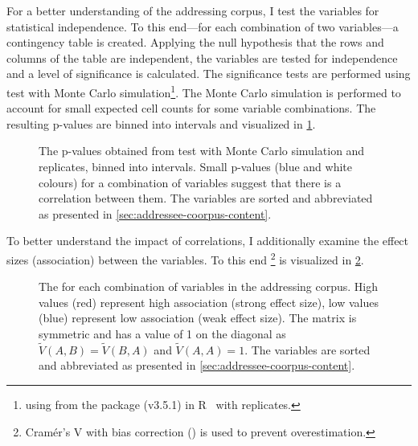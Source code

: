 For a better understanding of the \gls{addressing corpus}, I test the variables for statistical independence.
To this end---for each combination of two variables---a contingency table is created. 
Applying the null hypothesis that the rows and columns of the table are independent, the variables are tested for independence and a level of significance is calculated.
The significance tests are performed using \chisq{} test with Monte Carlo simulation\footnote{using  from the  package (v3.5.1) in R~\cite{stats} with  replicates.}.
The Monte Carlo simulation is performed to account for small expected cell counts for some variable combinations.
The resulting p-values are binned into intervals and visualized in \cref{fig:study-addressees-chisq}.
\begin{figure}[htb]
    \centering
    
    \caption[Association of addressing variables.]{\label{fig:study-addressees-chisq}
    The p-values obtained from \chisq{} test with Monte Carlo simulation and  replicates, binned into intervals.
    Small p-values (blue and white colours) for a combination of variables suggest that there is a correlation between them. 
    The variables are sorted and abbreviated as presented in \cref{sec:addressee-coorpus-content}.
}
\end{figure}
To better understand the impact of correlations, I additionally examine the effect sizes (association) between the variables.
To this end \cramv{}\footnote{Cram\'er's V with bias correction (\cramv) is used to prevent overestimation.} is visualized in \cref{fig:study-addressees-cramer}.
\begin{figure}[htb]
    \centering
    
    \caption[\cramv{} for all combinations of variables.]{\label{fig:study-addressees-cramer}
    The \cramv{} for each combination of variables in the \gls{addressing corpus}.
    High values (red) represent high association (strong effect size), low values (blue) represent low association (weak effect size).
    The matrix is symmetric and has a value of 1 on the diagonal as \(\tilde{V}(A,B) = \tilde{V}(B,A)\) and \(\tilde{V}(A,A) = 1\).
    The variables are sorted and abbreviated as presented in \cref{sec:addressee-coorpus-content}.
    }
\end{figure}

